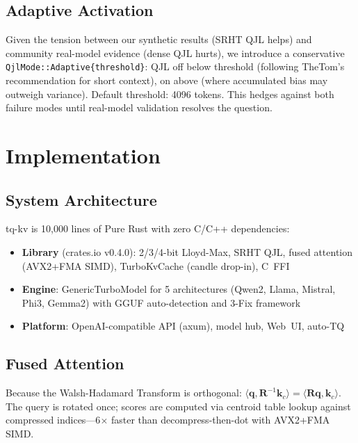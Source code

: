 \documentclass[11pt]{article}
\begin{document}
\subsection{Adaptive Activation}

Given the tension between our synthetic results (SRHT QJL helps) and community real-model evidence (dense QJL hurts), we introduce a conservative \texttt{QjlMode::Adaptive\{threshold\}}: QJL off below threshold (following TheTom's recommendation for short context), on above (where accumulated bias may outweigh variance). Default threshold: 4096 tokens. This hedges against both failure modes until real-model validation resolves the question.

\section{Implementation}
\label{sec:impl}

\subsection{System Architecture}

tq-kv is 10,000 lines of Pure Rust with zero C/C++ dependencies:

\begin{itemize}
    \item \textbf{Library} (crates.io v0.4.0): 2/3/4-bit Lloyd-Max, SRHT QJL, fused attention (AVX2+FMA SIMD), TurboKvCache (candle drop-in), C~FFI
    \item \textbf{Engine}: GenericTurboModel for 5 architectures (Qwen2, Llama, Mistral, Phi3, Gemma2) with GGUF auto-detection and 3-Fix framework
    \item \textbf{Platform}: OpenAI-compatible API (axum), model hub, Web~UI, auto-TQ
\end{itemize}

\subsection{Fused Attention}

Because the Walsh-Hadamard Transform is orthogonal: $\langle \mathbf{q}, \mathbf{R}^{-1} \mathbf{k}_c \rangle = \langle \mathbf{R}\mathbf{q}, \mathbf{k}_c \rangle$. The query is rotated once; scores are computed via centroid table lookup against compressed indices---6$\times$ faster than decompress-then-dot with AVX2+FMA SIMD.
\end{document}
